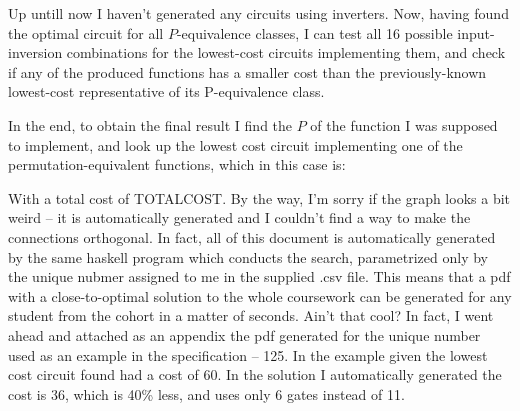 \documentclass[12pt]{article}
\begin{document}
Up untill now I haven't generated any circuits using inverters. Now, having found the optimal circuit for all $P$-equivalence 
classes, I can test all 16 possible input-inversion combinations for the lowest-cost circuits implementing them, and check if any of 
the produced functions has a smaller cost than the previously-known lowest-cost representative of its P-equivalence class.

In the end, to obtain the final result I find the $P$ of the function I was supposed to implement, and look up the lowest
cost circuit implementing one of the permutation-equivalent functions, which in this case is:

\begin{center}


\end{center}

With a total cost of TOTALCOST. By the way, I'm sorry if the graph looks a bit weird -- it is automatically generated
and I couldn't find a way to make the connections orthogonal. In fact, all of this document is automatically
generated by the same haskell program which conducts the search, parametrized only by the unique nubmer
assigned to me in the supplied .csv file. This means that a pdf with a close-to-optimal solution to the
whole coursework can be generated for any student from the cohort in a matter of seconds. Ain't that cool?
In fact, I went ahead and attached as an appendix the pdf generated for the unique number used as an example in the specification -- 125.
In the example given the lowest cost circuit found had a cost of 60. 
In the solution I automatically generated the cost is 36, which is 40\% less, and uses only 6 gates instead of 11.
\end{document}
